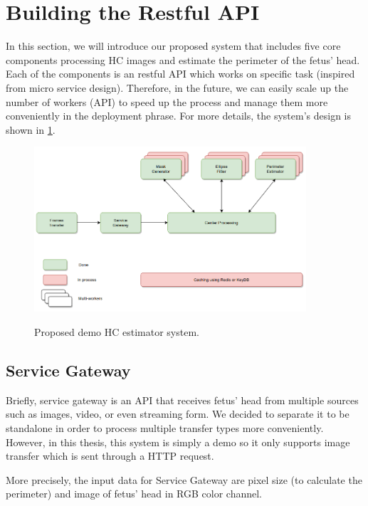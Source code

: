 \section{Building the Restful API}
\noindent

	In this section, we will introduce our proposed system that includes five core components processing HC images and estimate the perimeter of the fetus' head. Each of the components is an restful API which works on specific task (inspired from micro service design). Therefore, in the future, we can easily scale up the number of workers (API) to speed up the process and manage them more conveniently in the deployment phrase. For more details, the system's design is shown in \ref{fig:hc_system}.
	
	\begin{figure}[H]
		\centering
		{\includegraphics[width=0.9\textwidth]{./hinhanh/chap6/hc_system.png}}
		\caption{Proposed demo HC estimator system.}
		\label{fig:hc_system}
	\end{figure}

\subsection{Service Gateway}
\noindent

	Briefly, service gateway is an API that receives fetus' head from multiple sources such as images, video, or even streaming form. We decided to separate it to be standalone in order to process multiple transfer types more conveniently. However, in this thesis, this system is simply a demo so it only supports image transfer which is sent through a HTTP request.
	
	More precisely, the input data for Service Gateway are pixel size (to calculate the perimeter) and image of fetus' head in RGB color channel.
	
